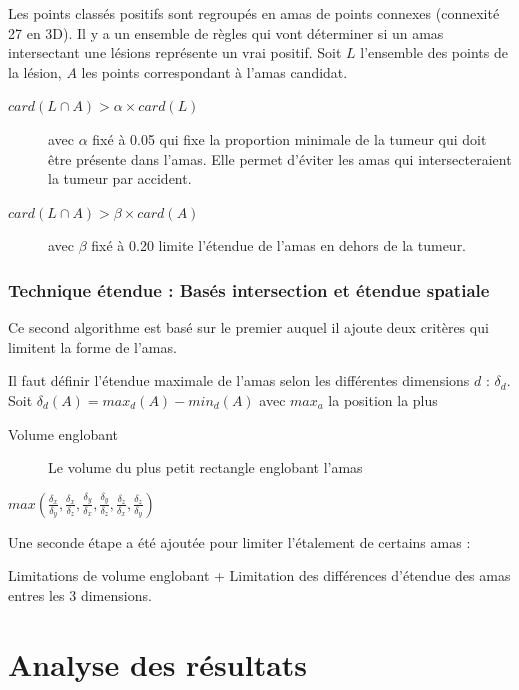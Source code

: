 Les points classés positifs sont regroupés en amas de points connexes (connexité 27 en 3D). Il y a un ensemble de règles qui vont déterminer si un amas intersectant une lésions représente un vrai positif. Soit $L$ l'ensemble des points de la lésion, $A$ les points correspondant à l'amas candidat.

\begin{description}
 \item[$card( L \cap A ) > \alpha \times card( L )$] avec $\alpha$ fixé à 0.05 qui fixe la proportion minimale de la tumeur qui doit être présente dans l'amas. Elle permet d'éviter les amas qui intersecteraient la tumeur par accident.
 \item[$card( L \cap A ) > \beta \times card( A )$]  avec $\beta$ fixé à 0.20 limite l'étendue de l'amas en dehors de la tumeur.
\end{description}

\subsection{Technique étendue : Basés intersection et étendue spatiale}

Ce second algorithme est basé sur le premier auquel il ajoute deux critères qui limitent la forme de l'amas.

Il faut définir l'étendue maximale de l'amas selon les différentes dimensions $d$ : $\delta_d$. Soit $\delta_d(A) = max_d(A) - min_d(A)$ avec $max_a$ la position la plus 

\begin{description}
 \item[Volume englobant] Le volume du plus petit rectangle englobant l'amas
 \item[]
\end{description}

$max \left( \frac{\delta_x}{\delta_y}, \frac{\delta_x}{\delta_z}, \frac{\delta_y}{\delta_x}, \frac{\delta_y}{\delta_z}, \frac{\delta_z}{\delta_x}, \frac{\delta_z}{\delta_y} \right)$


Une seconde étape a été ajoutée pour limiter l'étalement de certains amas :

Limitations de volume englobant + Limitation des différences d'étendue des amas entres les 3 dimensions.


\chapter{Analyse des résultats}

